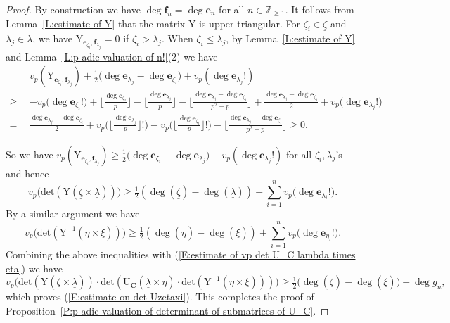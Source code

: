 \documentclass[12pt]{amsart}
\theoremstyle{definition}
\numberwithin{equation}{subsection}
\def\ZZ{\mathbb{Z}}
\def\bfe{\mathbf{e}}
\def\bff{\mathbf{f}}
\def\bfC{\mathbf{C}}
\def\rmU{\mathrm{U}}
\def\rmY{\mathrm{Y}}
\renewcommand{\det}{\mathrm{det}}
\begin{document}
\begin{proof}
    By construction we have $\deg \bff_n=\deg \bfe_n$ for all $n\in \ZZ_{\geq 1}$. It follows from Lemma~\ref{L:estimate of Y} that the matrix $\rmY$ is upper triangular. For $\zeta_i\in  \underline \zeta$ and $\lambda_j\in \underline \lambda$,  we have $\rmY_{\bfe_{\zeta_i},\bff_{\lambda_j}}= 0$ if $\zeta_i>\lambda_j$.   When $\zeta_i\leq \lambda_j$, by Lemma~\ref{L:estimate of Y} and Lemma~\ref{L:p-adic valuation of n!}(2) we have 
	\begin{align*}
	&v_p(\rmY_{\bfe_{\zeta_i}, \bff_{\lambda_j}}) + \tfrac 12\big(\deg \bfe_{\lambda_j} - \deg \bfe_{\zeta_i}\big)  + v_p(\deg \bfe_{\lambda_j}!)
	\\
	\geq\ \ & -v_p\big(\deg \bfe_{\zeta_i}! \big)  
	+  \Big\lfloor \tfrac{\deg \bfe_{\zeta_i}}p\Big\rfloor
	- \Big\lfloor \tfrac{\deg \bfe_{\lambda_j}}p\Big\rfloor
	- \Big\lfloor \tfrac{\deg \bfe_{\lambda_j} - \deg \bfe_{\zeta_i} }{p^2-p}\Big\rfloor+\tfrac {\deg \bfe_{\lambda_j} - \deg \bfe_{\zeta_i}}2 +v_p\big(\deg\bfe_{\lambda_j}! \big)
	\\
	=\ \ &\tfrac {\deg \bfe_{\lambda_j} - \deg \bfe_{\zeta_i}}2 +v_p\Big(\Big\lfloor \tfrac{\deg \bfe_{\lambda_j}}p\Big\rfloor!\Big) - v_p\Big(\Big\lfloor \tfrac{\deg \bfe_{\zeta_i}}p\Big\rfloor !\Big) - \Big\lfloor \tfrac{\deg \bfe_{\lambda_j} - \deg \bfe_{\zeta_i} }{p^2-p} \Big\rfloor \geq 0.
	\end{align*}

    So we have $v_p(\rmY_{\bfe_{\zeta_i}, \bff_{\lambda_j}})\geq \tfrac 12\big(\deg \bfe_{\zeta_i} -\deg \bfe_{\lambda_j}  \big)  - v_p(\deg \bfe_{\lambda_j}!)$ for all $\zeta_i,\lambda_j$'s and hence
    \[
    v_p\big( \det(\rmY(\underline \zeta\times \underline \lambda)) \big)\geq \tfrac 12 (\deg(\underline \zeta)-\deg(\underline \lambda))-\sum_{i=1}^n v_p\big(\deg \bfe_{\lambda_i}! \big).
    \]
    By a similar argument we have
    \[
    v_p\big( \det(\rmY^{-1}(\underline \eta\times \underline \xi)) \big) \geq \tfrac 12 (\deg(\underline \eta)-\deg(\underline \xi))+\sum_{i=1}^n v_p\big(\deg \bfe_{\eta_i}! \big).
    \]
    Combining the above inequalities with (\ref{E:estimate of vp det U_C lambda times eta}) we have 
	\begin{equation}\label{E:p-adic valuation of det Y times U_C times Y -1}
v_p\big(\det(\rmY(\underline \zeta\times \underline \lambda)) \cdot \det(\rmU_\bfC(\underline \lambda \times \underline \eta ) \cdot   \det(\rmY^{-1}(\underline \eta\times \underline \xi)) ) \big)\geq \tfrac 12 \big(\deg(\underline \zeta)-\deg(\underline \xi)\big)+\deg g_n,
	\end{equation}
which proves (\ref{E:estimate on det Uzetaxi}). This completes the proof of Proposition~\ref{P:p-adic valuation of determinant of submatrices of U_C}.
\end{proof}
\end{document}

